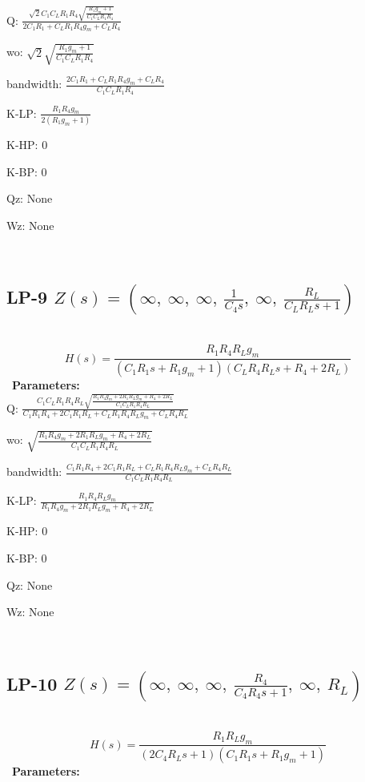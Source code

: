 \documentclass{article}
\begin{document}
Q: $\frac{\sqrt{2} C_{1} C_{L} R_{1} R_{4} \sqrt{\frac{R_{1} g_{m} + 1}{C_{1} C_{L} R_{1} R_{4}}}}{2 C_{1} R_{1} + C_{L} R_{1} R_{4} g_{m} + C_{L} R_{4}}$\ 

wo: $\sqrt{2} \sqrt{\frac{R_{1} g_{m} + 1}{C_{1} C_{L} R_{1} R_{4}}}$\ 

bandwidth: $\frac{2 C_{1} R_{1} + C_{L} R_{1} R_{4} g_{m} + C_{L} R_{4}}{C_{1} C_{L} R_{1} R_{4}}$\ 

K-LP: $\frac{R_{1} R_{4} g_{m}}{2 \left(R_{1} g_{m} + 1\right)}$\ 

K-HP: $0$\ 

K-BP: $0$\ 

Qz: $\text{None}$\ 

Wz: $\text{None}$\ 

\ 

\subsection{LP-9 $Z(s) = \left( \infty, \  \infty, \  \infty, \  \frac{1}{C_{4} s}, \  \infty, \  \frac{R_{L}}{C_{L} R_{L} s + 1}\right)$ } \ 
\textbf{\[H(s) = \frac{R_{1} R_{4} R_{L} g_{m}}{\left(C_{1} R_{1} s + R_{1} g_{m} + 1\right) \left(C_{L} R_{4} R_{L} s + R_{4} + 2 R_{L}\right)}\] } \ 
\textbf{Parameters:}\\ 

Q: $\frac{C_{1} C_{L} R_{1} R_{4} R_{L} \sqrt{\frac{R_{1} R_{4} g_{m} + 2 R_{1} R_{L} g_{m} + R_{4} + 2 R_{L}}{C_{1} C_{L} R_{1} R_{4} R_{L}}}}{C_{1} R_{1} R_{4} + 2 C_{1} R_{1} R_{L} + C_{L} R_{1} R_{4} R_{L} g_{m} + C_{L} R_{4} R_{L}}$\ 

wo: $\sqrt{\frac{R_{1} R_{4} g_{m} + 2 R_{1} R_{L} g_{m} + R_{4} + 2 R_{L}}{C_{1} C_{L} R_{1} R_{4} R_{L}}}$\ 

bandwidth: $\frac{C_{1} R_{1} R_{4} + 2 C_{1} R_{1} R_{L} + C_{L} R_{1} R_{4} R_{L} g_{m} + C_{L} R_{4} R_{L}}{C_{1} C_{L} R_{1} R_{4} R_{L}}$\ 

K-LP: $\frac{R_{1} R_{4} R_{L} g_{m}}{R_{1} R_{4} g_{m} + 2 R_{1} R_{L} g_{m} + R_{4} + 2 R_{L}}$\ 

K-HP: $0$\ 

K-BP: $0$\ 

Qz: $\text{None}$\ 

Wz: $\text{None}$\ 

\ 

\subsection{LP-10 $Z(s) = \left( \infty, \  \infty, \  \infty, \  \frac{R_{4}}{C_{4} R_{4} s + 1}, \  \infty, \  R_{L}\right)$ } \ 
\textbf{\[H(s) = \frac{R_{1} R_{L} g_{m}}{\left(2 C_{4} R_{L} s + 1\right) \left(C_{1} R_{1} s + R_{1} g_{m} + 1\right)}\] } \ 
\textbf{Parameters:}\\ 
\end{document}
